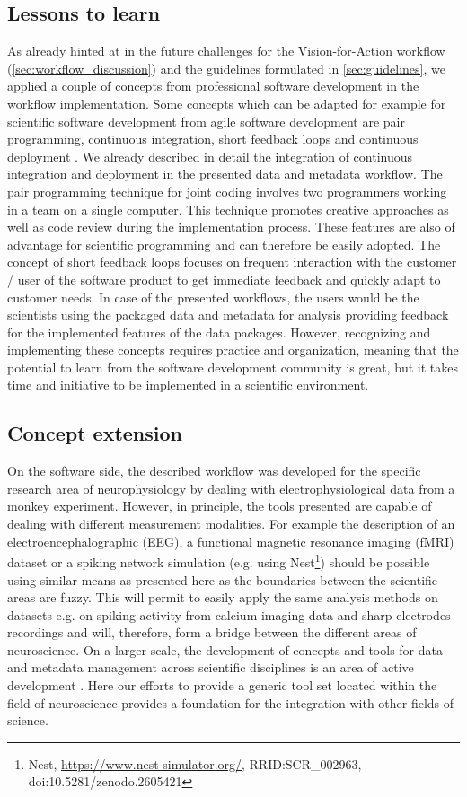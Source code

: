 \subsection{Lessons to learn}
As already hinted at in the future challenges for the Vision-for-Action workflow (\cref{sec:workflow_discussion}) and the guidelines formulated in \cref{sec:guidelines}, we applied a couple of concepts from professional software development in the workflow implementation. Some concepts which can be adapted for example for scientific software development from agile software development are pair programming, continuous integration, short feedback loops and continuous deployment \citep{Shore_2007}. We already described in detail the integration of continuous integration and deployment in the presented data and metadata workflow. The pair programming technique for joint coding involves two programmers working in a team on a single computer. This technique promotes creative approaches as well as code review during the implementation process. These features are also of advantage for scientific programming and can therefore be easily adopted. The concept of short feedback loops focuses on frequent interaction with the customer / user of the software product to get immediate feedback and quickly adapt to customer needs. In case of the presented workflows, the users would be the scientists using the packaged data and metadata for analysis providing feedback for the implemented features of the data packages. However, recognizing and implementing these concepts requires practice and organization, meaning that the potential to learn from the software development community is great, but it takes time and initiative to be implemented in a scientific environment.

\subsection{Concept extension}
On the software side, the described workflow was developed for the specific research area of neurophysiology by dealing with electrophysiological data from a monkey experiment. However, in principle, the tools presented are capable of dealing with different measurement modalities. For example the description of an electroencephalographic (EEG), a functional magnetic resonance imaging (fMRI) dataset or a spiking network simulation (e.g. using Nest\footnote{Nest, \url{https://www.nest-simulator.org/}, RRID:SCR\_002963, doi:10.5281/zenodo.2605421}) should be possible using similar means as presented here as the boundaries between the scientific areas are fuzzy. This will permit to easily apply the same analysis methods on datasets e.g. on spiking activity from calcium imaging data and sharp electrodes recordings and will, therefore, form a bridge between the different areas of neuroscience.
On a larger scale, the development of concepts and tools for data and metadata management across scientific disciplines is an area of active development \citep{Amari_2002, Cheung_2009, Nichols_2015}. Here our efforts to provide a generic tool set located within the field of neuroscience provides a foundation for the integration with other fields of science.

